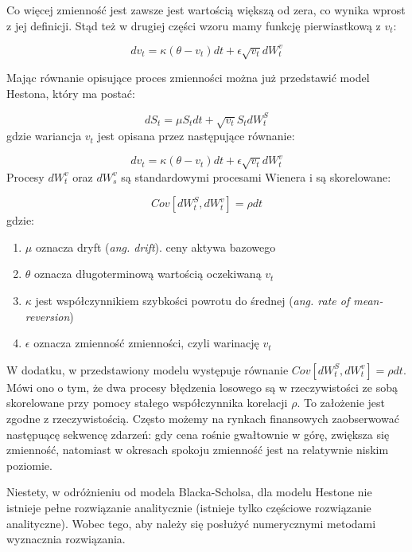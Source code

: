 \documentclass{pracamgr}
\begin{document}
Co więcej zmienność jest zawsze jest wartością większą od zera, co wynika wprost z jej definicji. Stąd też w drugiej części wzoru mamy funkcję pierwiastkową z $v_t$: 

\begin{equation} 
dv_t  = \kappa (\theta - v_t)dt + \epsilon \sqrt{v_t} dW_t^v 
\end{equation}

Mając równanie opisujące proces zmienności można już przedstawić model Hestona, który ma postać:

\begin{equation}
dS_t  = \mu S_t dt + \sqrt{v_t} S_t dW^S_t
\end{equation}
gdzie wariancja $v_t$ jest opisana przez następujące równanie: 

\begin{equation}
dv_t  = \kappa (\theta - v_t)dt + \epsilon \sqrt{v_t} dW_t^v 
\end{equation}
Procesy $dW_t^v$ oraz $dW_s^v$ są standardowymi procesami Wienera i są skorelowane:

\begin{equation}
Cov[dW^S_t, dW^v_t] = \rho dt 
\end{equation}
gdzie:

\begin{enumerate}
\item $\mu$ oznacza dryft (\textit{ang. drift}). ceny aktywa bazowego 
\item $\theta$ oznacza długoterminową wartością oczekiwaną $v_t$
\item $\kappa$ jest współczynnikiem szybkości powrotu do średnej (\textit{ang. rate of mean-reversion})
\item $\epsilon$ oznacza zmienność zmienności, czyli warinację $v_t$
\end{enumerate}

W dodatku, w przedstawiony modelu występuje równanie $Cov[dW^S_t, dW^v_t] = \rho dt $. Mówi ono o tym, że 
dwa procesy błędzenia losowego są w rzeczywistości ze sobą skorelowane przy pomocy stałego współczynnika 
korelacji $\rho$.
To założenie jest zgodne z rzeczywistością. Często możemy na rynkach finansowych zaobserwować następuącę sekwencę zdarzeń: gdy cena rośnie gwałtownie w górę, zwiększa się zmienność, 
natomiast w okresach spokoju zmienność jest na relatywnie niskim poziomie.

Niestety, w odróżnieniu od modela Blacka-Scholsa, dla modelu Hestone nie istnieje pełne rozwiązanie analitycznie (istnieje tylko częściowe rozwiązanie analityczne). Wobec tego, aby należy się posłużyć numerycznymi metodami wyznacznia rozwiązania.
\end{document}
